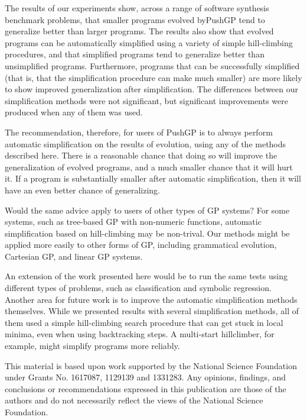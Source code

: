 The results of our experiments show, across a range of software synthesis benchmark problems, that smaller programs evolved byPushGP tend to generalize better than larger programs. The results also show that evolved programs can be automatically simplified using a variety of simple hill-climbing procedures, and that simplified programs tend to generalize better than unsimplified programs. Furthermore, programs that can be successfully simplified (that is, that the simplification procedure can make much smaller) are more likely to show improved generalization after simplification. The differences between our simplification methods were not significant, but significant improvements were produced when any of them was used.

The recommendation, therefore, for users of PushGP is to always perform automatic simplification on the results of evolution, using any of the methods described here. There is a reasonable chance that doing so will improve the generalization of evolved programs, and a much smaller chance that it will hurt it. If a program is substantially smaller after automatic simplification, then it will have an even better chance of generalizing.

Would the same advice apply to users of other types of GP systems? For some systems, such as tree-based GP with non-numeric functions, automatic simplification based on hill-climbing may be non-trival. Our methods might be applied more easily to other forms of GP, including grammatical evolution, Cartesian GP, and linear GP systems.

An extension of the work presented here would be to run the same tests using different types of problems, such as classification and symbolic regression. Another area for future work is to improve the automatic simplification methods themselves. While we presented results with several simplification methods, all of them used a simple hill-climbing search procedure that can get stuck in local minima, even when using backtracking steps. A multi-start hillclimber, for example, might simplify programs more reliably.


\begin{acks}
  
This material is based upon work supported by the National Science Foundation under Grants No. 1617087, 1129139 and 1331283. Any opinions, findings, and conclusions or recommendations expressed in this publication are those of the authors and do not necessarily reflect the views of the National Science Foundation.

\end{acks}
